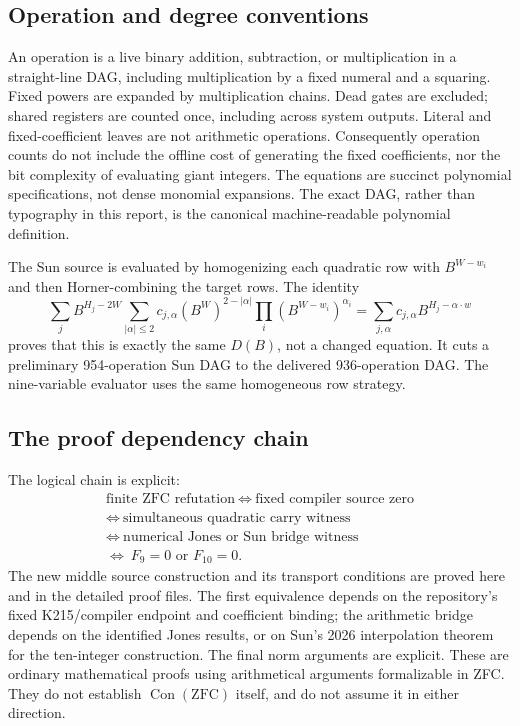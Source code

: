 \documentclass[11pt]{article}
\newcommand{\Con}{\operatorname{Con}}
\begin{document}
\subsection{Operation and degree conventions}
An operation is a live binary addition, subtraction, or multiplication in a
straight-line DAG, including multiplication by a fixed numeral and a
squaring. Fixed powers are expanded by multiplication chains. Dead gates
are excluded; shared registers are counted once, including across system
outputs. Literal and fixed-coefficient leaves are not arithmetic operations.
Consequently operation counts do not include the offline cost of generating
the fixed coefficients, nor the bit complexity of evaluating giant integers.
The equations are succinct polynomial specifications, not dense monomial
expansions. The exact DAG, rather than typography in this report, is the
canonical machine-readable polynomial definition.

The Sun source is evaluated by homogenizing each quadratic row with
$B^{W-w_i}$ and then Horner-combining the target rows. The identity
\[
 \sum_j B^{H_j-2W}\!\sum_{|\alpha|\le2}c_{j,\alpha}
 (B^W)^{2-|\alpha|}\prod_i(B^{W-w_i})^{\alpha_i}
 =\sum_{j,\alpha}c_{j,\alpha}B^{H_j-\alpha\cdot w}
\]
proves that this is exactly the same $D(B)$, not a changed equation.
It cuts a preliminary 954-operation Sun DAG to the delivered 936-operation
DAG. The nine-variable evaluator uses the same homogeneous row strategy.

\subsection{The proof dependency chain}
The logical chain is explicit:
\[
 \begin{gathered}
 \text{finite ZFC refutation}\ \Longleftrightarrow\
 \text{fixed compiler source zero}\\
 \Longleftrightarrow\ \text{simultaneous quadratic carry witness}\\
 \Longleftrightarrow\ \text{numerical Jones or Sun bridge witness}\\
 \Longleftrightarrow\ F_9=0\text{ or }F_{10}=0.
 \end{gathered}
\]
The new middle source construction and its transport conditions are proved
here and in the detailed proof files. The first equivalence depends on the
repository's fixed K215/compiler endpoint and coefficient binding; the
arithmetic bridge depends on the identified Jones results, or on Sun's
2026 interpolation theorem for the ten-integer construction. The final norm
arguments are explicit. These are ordinary mathematical proofs using
arithmetical arguments formalizable in ZFC. They do not establish
$\Con(\mathrm{ZFC})$ itself, and do not assume it in either direction.
\end{document}
